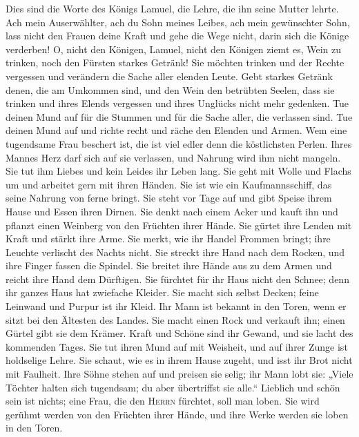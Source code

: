  Dies sind die Worte des Königs Lamuel, die Lehre, die ihn
seine Mutter lehrte.  Ach mein Auserwählter, ach du Sohn
meines Leibes, ach mein gewünschter Sohn,  lass nicht den
Frauen deine Kraft und gehe die Wege nicht, darin sich die Könige
verderben!  O, nicht den Königen, Lamuel, nicht den
Königen ziemt es, Wein zu trinken, noch den Fürsten starkes Getränk!
 Sie möchten trinken und der Rechte vergessen und
verändern die Sache aller elenden Leute.  Gebt starkes
Getränk denen, die am Umkommen sind, und den Wein den betrübten Seelen,
 dass sie trinken und ihres Elends vergessen und ihres
Unglücks nicht mehr gedenken.  Tue deinen Mund auf für die
Stummen und für die Sache aller, die verlassen sind.  Tue
deinen Mund auf und richte recht und räche den Elenden und Armen.
 Wem eine tugendsame Frau beschert ist, die ist viel
edler denn die köstlichsten Perlen.  Ihres Mannes Herz
darf sich auf sie verlassen, und Nahrung wird ihm nicht mangeln.
 Sie tut ihm Liebes und kein Leides ihr Leben lang.
 Sie geht mit Wolle und Flachs um und arbeitet gern mit
ihren Händen.  Sie ist wie ein Kaufmannsschiff, das seine
Nahrung von ferne bringt.  Sie steht vor Tage auf und
gibt Speise ihrem Hause und Essen ihren Dirnen.  Sie
denkt nach einem Acker und kauft ihn und pflanzt einen Weinberg von den
Früchten ihrer Hände.  Sie gürtet ihre Lenden mit Kraft
und stärkt ihre Arme.  Sie merkt, wie ihr Handel Frommen
bringt; ihre Leuchte verlischt des Nachts nicht.  Sie
streckt ihre Hand nach dem Rocken, und ihre Finger fassen die Spindel.
 Sie breitet ihre Hände aus zu dem Armen und reicht ihre
Hand dem Dürftigen.  Sie fürchtet für ihr Haus nicht den
Schnee; denn ihr ganzes Haus hat zwiefache Kleider.  Sie
macht sich selbst Decken; feine Leinwand und Purpur ist ihr Kleid.
 Ihr Mann ist bekannt in den Toren, wenn er sitzt bei den
Ältesten des Landes.  Sie macht einen Rock und verkauft
ihn; einen Gürtel gibt sie dem Krämer.  Kraft und Schöne
sind ihr Gewand, und sie lacht des kommenden Tages.  Sie
tut ihren Mund auf mit Weisheit, und auf ihrer Zunge ist holdselige
Lehre.  Sie schaut, wie es in ihrem Hause zugeht, und
isst ihr Brot nicht mit Faulheit.  Ihre Söhne stehen auf
und preisen sie selig; ihr Mann lobt sie:  „Viele Töchter
halten sich tugendsam; du aber übertriffst sie alle.`` 
Lieblich und schön sein ist nichts; eine Frau, die den \textsc{Herrn}
fürchtet, soll man loben.  Sie wird gerühmt werden von
den Früchten ihrer Hände, und ihre Werke werden sie loben in den Toren.
